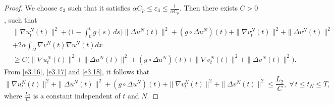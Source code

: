 \documentclass[reqno]{amsart}
\begin{document}
\begin{proof}
We choose $\varepsilon_{3}$ such that it satisfies
$\alpha C_p \leq \varepsilon_{3}\leq \frac{l}{\alpha C_p}$.
Then there exists $C>0$, such that
\begin{equation}
\begin{aligned}
&\| \nabla u^N_{t}(t) \|^2+\Big( 1 - \int_0^t g(s)\,ds \Big) \| \Delta u^N(t) \|^2
+ (g \circ \Delta u^N)(t) + \| \nabla v^N_{t}(t) \|^2+ \| \Delta v^N(t) \|^2\\
&+2 \alpha \int_{\Omega} \nabla v^N (t)\nabla u^N (t) dx \\
&\geq C \Big( \| \nabla u^N_{t}(t) \|^2+ \| \Delta u^N (t)\|^2
+ (g \circ \Delta u^N)(t) + \| \nabla v^N_{t}(t) \|^2
+ \| \Delta v^N (t)\|^2 \Big).
\end{aligned} \label{e3.18}
\end{equation}
From \eqref{e3.16}, \eqref{e3.17} and \eqref{e3.18}, it follows that
\begin{equation}
\| \nabla u^N_{t}(t) \|^2+ \| \Delta u^N(t) \|^2 + (g \circ \Delta u^N)(t)
+ \| \nabla v^N_{t}(t) \|^2+ \| \Delta v^N(t) \|^2
\leq \frac{L_2}{C}, \; \forall\, t\leq t_{N} \leq T,\label{e3.19}
 \end{equation}
where $\frac{L_2}{C}$ is a constant independent of $t$ and $N$.
\smallskip


\end{proof}
\end{document}
